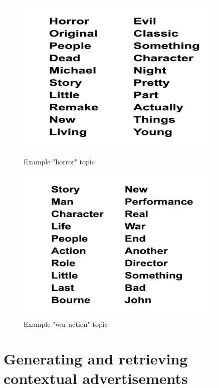 \documentclass[11pt]{article}
\begin{document}
\begin{figure}[h!]
    \centering
    \begin{minipage}{0.45\textwidth}
        \centering
        \includegraphics[width=0.9\textwidth]{horrortopic}
        \caption{Example "horror" topic}
    \end{minipage}\hfill
    \begin{minipage}{0.45\textwidth}
        \centering
        \includegraphics[width=0.9\textwidth]{waractiontopic} %
        \caption{Example "war action" topic}
    \end{minipage}
\end{figure}


\section{Generating and retrieving contextual advertisements}
\end{document}
